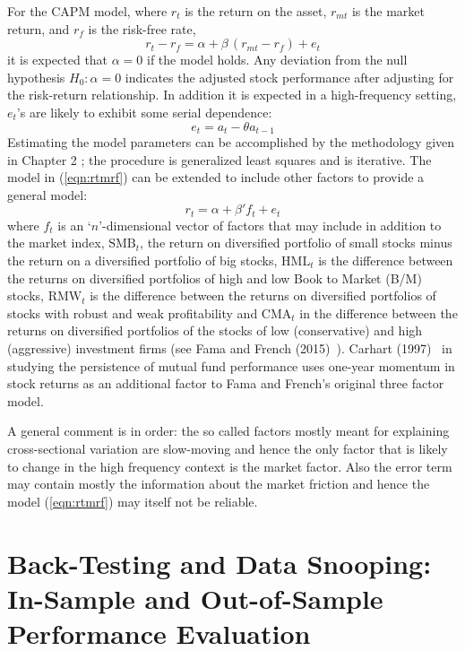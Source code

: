 For the CAPM model, where $r_t$ is the return on the asset, $r_{mt}$ is the market return, and $r_f$ is the risk-free rate,
	\begin{equation}\label{eqn:rtmrf}
	r_t - r_f = \alpha + \beta \,( r_{mt} - r_f ) + e_t
	\end{equation}
it is expected that $\alpha=0$ if the model holds. Any deviation from the null hypothesis $H_0:\alpha=0$ indicates the adjusted stock performance after adjusting for the risk-return relationship. In addition it is expected in a high-frequency setting, $e_t$'s are likely to exhibit some serial dependence:
	\begin{equation}\label{eqn:et}
	e_t = a_t - \theta a_{t-1}
	\end{equation}
Estimating the model parameters can be accomplished by the methodology given in Chapter 2 ; the procedure is generalized least squares and is iterative. The model in (\ref{eqn:rtmrf}) can be extended to include other factors to provide a general model:
	\begin{equation}\label{eqn:rtalpha}
	r_t = \alpha + \beta'f_{t} + e_t
	\end{equation}
where $f_t$ is an `$n$'-dimensional vector of factors that may include in addition to the market index, $\text{SMB}_t$, the return on diversified portfolio of small stocks minus the return on a diversified portfolio of big stocks, $\text{HML}_t$ is the difference between the returns on diversified portfolios of high and low Book to Market (B/M) stocks, $\text{RMW}_t$ is the difference between the returns on diversified portfolios of stocks with robust and weak profitability and $\text{CMA}_t$ in the difference between the returns on diversified portfolios of the stocks of low (conservative) and high (aggressive) investment firms (see Fama and French (2015)~\cite{fama2015}). Carhart (1997)~\cite{carhart1997persistence} in studying the persistence of mutual fund performance uses one-year momentum in stock returns as an additional factor to Fama and French's original three factor model.


A general comment is in order: the so called factors mostly meant for explaining cross-sectional variation are slow-moving and hence the only factor that is likely to change in the high frequency context is the market factor. Also the error term may contain mostly the information about the market friction and hence the model (\ref{eqn:rtmrf}) may itself not be reliable.


\section{Back-Testing and Data Snooping:  In-Sample and Out-of-Sample Performance Evaluation}


